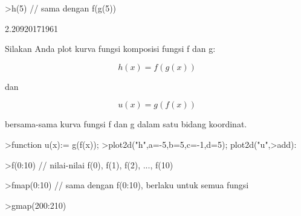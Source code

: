 \documentclass[12pt,arial,letterpaper]{book}
\begin{document}
\begin{eulercomment}
\begin{eulercomment}
\begin{eulercomment}
\begin{eulercomment}
\begin{eulercomment}
\begin{eulercomment}
\begin{eulercomment}
\begin{eulercomment}
\begin{eulercomment}
\begin{eulercomment}
\begin{eulercomment}
\begin{eulercomment}
\begin{eulercomment}
\begin{eulercomment}
\begin{eulercomment}
\begin{eulercomment}
\begin{eulercomment}
\begin{eulercomment}
\begin{eulerprompt}
>h(5) // sama dengan f(g(5))
\end{eulerprompt}
\begin{euleroutput}
  2.20920171961
\end{euleroutput}
\begin{eulercomment}
Silakan Anda plot kurva fungsi komposisi fungsi f dan g:

\end{eulercomment}
\begin{eulerformula}
\[
h(x)=f(g(x))
\]
\end{eulerformula}
\begin{eulercomment}
dan

\end{eulercomment}
\begin{eulerformula}
\[
u(x)=g(f(x))
\]
\end{eulerformula}
\begin{eulercomment}
bersama-sama kurva fungsi f dan g dalam satu bidang koordinat.
\end{eulercomment}
\begin{eulerprompt}
>function u(x):= g(f(x));
>plot2d("h",a=-5,b=5,c=-1,d=5); plot2d("u",>add):
\end{eulerprompt}
\begin{eulerprompt}
>f(0:10) // nilai-nilai f(0), f(1), f(2), ..., f(10)
\end{eulerprompt}
\begin{euleroutput}
  [1,  4.31978,  10.4826,  19.1516,  32.4692,  50.3833,  72.7562,
  99.929,  130.69,  163.51,  200.58]
\end{euleroutput}
\begin{eulerprompt}
>fmap(0:10) // sama dengan f(0:10), berlaku untuk semua fungsi
\end{eulerprompt}
\begin{euleroutput}
  [1,  4.31978,  10.4826,  19.1516,  32.4692,  50.3833,  72.7562,
  99.929,  130.69,  163.51,  200.58]
\end{euleroutput}
\begin{eulerprompt}
>gmap(200:210)
\end{eulerprompt}
\begin{euleroutput}
  [0.987534,  0.987596,  0.987657,  0.987718,  0.987778,  0.987837,
  0.987896,  0.987954,  0.988012,  0.988069,  0.988126]
\end{euleroutput}
\begin{eulercomment}

\end{eulercomment}
\end{eulercomment}
\end{eulercomment}
\end{eulercomment}
\end{eulercomment}
\end{eulercomment}
\end{eulercomment}
\end{eulercomment}
\end{eulercomment}
\end{eulercomment}
\end{eulercomment}
\end{eulercomment}
\end{eulercomment}
\end{eulercomment}
\end{eulercomment}
\end{eulercomment}
\end{eulercomment}
\end{eulercomment}
\end{eulercomment}
\end{document}
